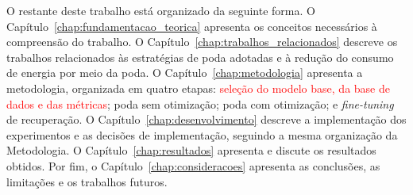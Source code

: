O restante deste trabalho está organizado da seguinte forma. O
Capítulo~\ref{chap:fundamentacao_teorica} apresenta os conceitos necessários à compreensão do
trabalho. O Capítulo~\ref{chap:trabalhos_relacionados} descreve os trabalhos relacionados às
estratégias de poda adotadas e à redução do consumo de energia por meio da poda. O
Capítulo~\ref{chap:metodologia} apresenta a metodologia, organizada em quatro etapas:
\textcolor{red}{seleção do modelo base, da base de dados e das métricas}; poda sem otimização;
poda com otimização; e \textit{fine-tuning} de recuperação. O
Capítulo~\ref{chap:desenvolvimento} descreve a implementação dos experimentos e as decisões de
implementação, seguindo a mesma organização da Metodologia. O Capítulo~\ref{chap:resultados}
apresenta e discute os resultados obtidos. Por fim, o Capítulo~\ref{chap:consideracoes}
apresenta as conclusões, as limitações e os trabalhos futuros.

